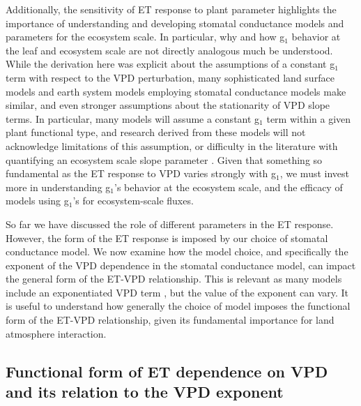 Additionally, the sensitivity of ET response to plant parameter
highlights the importance of understanding and developing stomatal
conductance models and parameters for the ecosystem scale. In
particular, why and how g$_1$ behavior at the leaf and ecosystem scale
are not directly analogous much be understood. While the derivation
here was explicit about the assumptions of a constant g$_1$ term with
respect to the VPD perturbation, many sophisticated land surface
models and earth system models employing stomatal conductance models
make similar, and even stronger assumptions about the stationarity of
VPD slope terms. In particular, many models will assume a constant
g$_1$ term within a given plant functional type, and research derived
from these models will not acknowledge limitations of this assumption,
or difficulty in the literature with quantifying an ecosystem scale
slope parameter \citep{Medlyn_2017}. Given that something so
fundamental as the ET response to VPD varies strongly with g$_1$, we
must invest more in understanding g$_1$'s behavior at the ecosystem
scale, and the efficacy of models using g$_1$'s for ecosystem-scale
fluxes.

So far we have discussed the role of different parameters in the ET
response. However, the form of the ET response is imposed by our
choice of stomatal conductance model. We now examine how the model
choice, and specifically the exponent of the VPD dependence in the
stomatal conductance model, can impact the general form of the ET-VPD
relationship. This is relevant as many models include an
exponentiated VPD term \citep[e.g.,][]{Leuning_1990}, but the value
of the exponent can vary. It is useful to understand how generally the
choice of model imposes the functional form of the ET-VPD
relationship, given its fundamental importance for land atmosphere
interaction.
\subsection{Functional form of ET dependence on VPD and its relation
  to the VPD exponent}
\label{functional_form}

